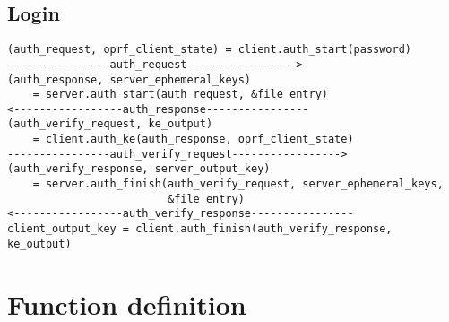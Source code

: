 \documentclass[../report.tex]{subfiles}
\begin{document}
\subsection{Login}
\begin{verbatim}
(auth_request, oprf_client_state) = client.auth_start(password)
----------------auth_request----------------->
(auth_response, server_ephemeral_keys) 
    = server.auth_start(auth_request, &file_entry)
<-----------------auth_response----------------
(auth_verify_request, ke_output) 
    = client.auth_ke(auth_response, oprf_client_state)
----------------auth_verify_request----------------->
(auth_verify_response, server_output_key) 
    = server.auth_finish(auth_verify_request, server_ephemeral_keys,
                         &file_entry)
<-----------------auth_verify_response----------------
client_output_key = client.auth_finish(auth_verify_response, ke_output)
\end{verbatim}

\section{Function definition} \label{sec:impl_function_def}
\end{document}
